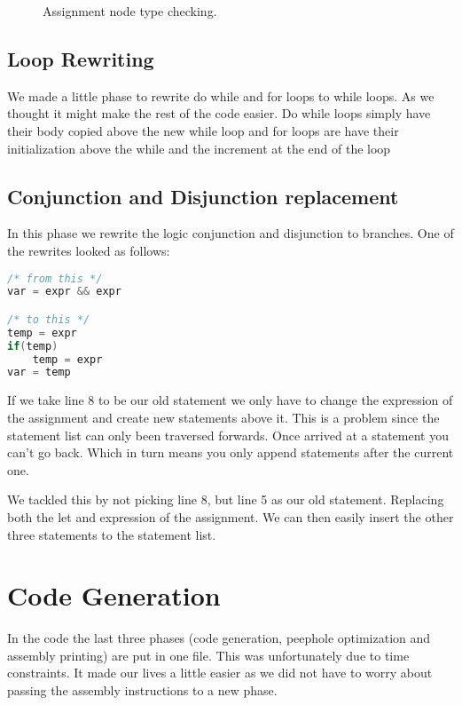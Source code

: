 \documentclass[a4paper]{article}
\begin{document}
\begin{figure}[h]
\label{fig:type}
\caption{Assignment node type checking.}
\end{figure}

\subsection{Loop Rewriting}
We made a little phase to rewrite do while and for loops to while loops. As we
thought it might make the rest of the code easier. Do while loops simply have
their body copied above the new while loop and for loops are have their
initialization above the while and the increment at the end of the loop

\subsection{Conjunction and Disjunction replacement}
In this phase we rewrite the logic conjunction and disjunction to branches. One
of the rewrites looked as follows:
\begin{lstlisting}[language=C]
/* from this */
var = expr && expr

/* to this */
temp = expr
if(temp)
    temp = expr
var = temp
\end{lstlisting}

If we take line 8 to be our old statement we only have to change the expression
of the assignment and create new statements above it. This is a problem since
the statement list can only been traversed forwards. Once arrived at a statement you can't go
back. Which in turn means you only append statements after the current one.

We tackled this by not picking line 8, but line 5 as our old statement. Replacing
both the let and expression of the assignment. We can then easily insert the
other three statements to the statement list.

\section{Code Generation}
In the code the last three phases (code generation, peephole optimization and
assembly printing) are put in one file. This was unfortunately due to time
constraints. It made our lives a little easier as we did not have to worry
about passing the assembly instructions to a new phase.
\end{document}
